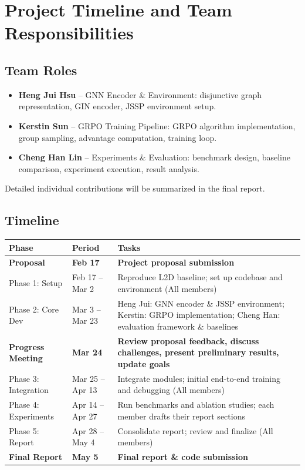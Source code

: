 \documentclass{article}
\begin{document}
\section{Project Timeline and Team Responsibilities}

\subsection{Team Roles}
\begin{itemize}
    \item \textbf{Heng Jui Hsu} -- GNN Encoder \& Environment: disjunctive graph representation, GIN encoder, JSSP environment setup.
    \item \textbf{Kerstin Sun} -- GRPO Training Pipeline: GRPO algorithm implementation, group sampling, advantage computation, training loop.
    \item \textbf{Cheng Han Lin} -- Experiments \& Evaluation: benchmark design, baseline comparison, experiment execution, result analysis.
\end{itemize}
Detailed individual contributions will be summarized in the final report.

\subsection{Timeline}
\begin{table}[H]
\centering
\begin{tabular}{@{}lp{2.8cm}p{6.5cm}@{}}
\toprule
\textbf{Phase} & \textbf{Period} & \textbf{Tasks} \\
\midrule
\textbf{Proposal} & \textbf{Feb 17} & \textbf{Project proposal submission} \\
\midrule
Phase 1: Setup & Feb 17 -- Mar 2 & Reproduce L2D baseline; set up codebase and environment (All members) \\
\midrule
Phase 2: Core Dev & Mar 3 -- Mar 23 & Heng Jui: GNN encoder \& JSSP environment; Kerstin: GRPO implementation; Cheng Han: evaluation framework \& baselines \\
\midrule
\textbf{Progress Meeting} & \textbf{Mar 24} & \textbf{Review proposal feedback, discuss challenges, present preliminary results, update goals} \\
\midrule
Phase 3: Integration & Mar 25 -- Apr 13 & Integrate modules; initial end-to-end training and debugging (All members) \\
\midrule
Phase 4: Experiments & Apr 14 -- Apr 27 & Run benchmarks and ablation studies; each member drafts their report sections \\
\midrule
Phase 5: Report & Apr 28 -- May 4 & Consolidate report; review and finalize (All members) \\
\midrule
\textbf{Final Report} & \textbf{May 5} & \textbf{Final report \& code submission} \\
\bottomrule
\end{tabular}
\end{table}
\end{document}
